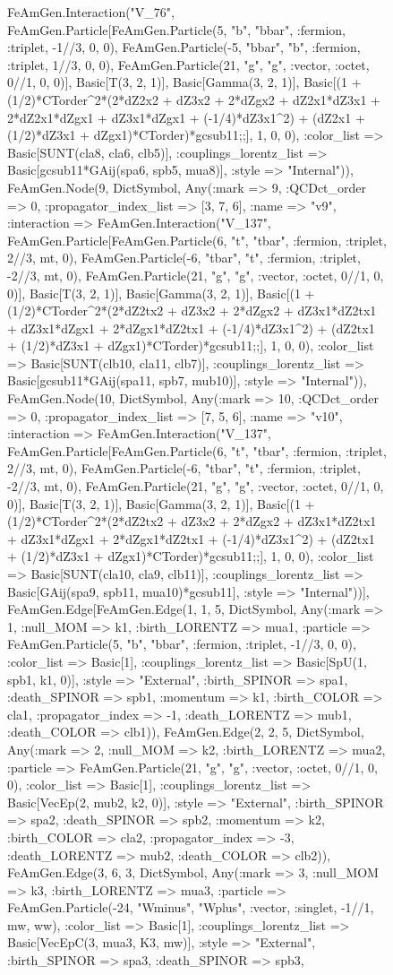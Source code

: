 \documentclass{revtex4}
\begin{document}
\begin{figure}[!htb]
\begin{center}
{FeAmGen.Interaction("V_76", FeAmGen.Particle[FeAmGen.Particle(5, "b", "bbar", :fermion, :triplet, -1//3, 0, 0), FeAmGen.Particle(-5, "bbar", "b", :fermion, :triplet, 1//3, 0, 0), FeAmGen.Particle(21, "g", "g", :vector, :octet, 0//1, 0, 0)], Basic[T(3, 2, 1)], Basic[Gamma(3, 2, 1)], Basic[(1 + (1/2)*CTorder^2*(2*dZ2x2 + dZ3x2 + 2*dZgx2 + dZ2x1*dZ3x1 + 2*dZ2x1*dZgx1 + dZ3x1*dZgx1 + (-1/4)*dZ3x1^2) + (dZ2x1 + (1/2)*dZ3x1 + dZgx1)*CTorder)*gcsub11;;], 1, 0, 0), :color_list => Basic[SUNT(cla8, cla6, clb5)], :couplings_lorentz_list => Basic[gcsub11*GAij(spa6, spb5, mua8)], :style => "Internal")), FeAmGen.Node(9, Dict{Symbol, Any}(:mark => 9, :QCDct_order => 0, :propagator_index_list => [3, 7, 6], :name => "v9", :interaction => FeAmGen.Interaction("V_137", FeAmGen.Particle[FeAmGen.Particle(6, "t", "tbar", :fermion, :triplet, 2//3, mt, 0), FeAmGen.Particle(-6, "tbar", "t", :fermion, :triplet, -2//3, mt, 0), FeAmGen.Particle(21, "g", "g", :vector, :octet, 0//1, 0, 0)], Basic[T(3, 2, 1)], Basic[Gamma(3, 2, 1)], Basic[(1 + (1/2)*CTorder^2*(2*dZ2tx2 + dZ3x2 + 2*dZgx2 + dZ3x1*dZ2tx1 + dZ3x1*dZgx1 + 2*dZgx1*dZ2tx1 + (-1/4)*dZ3x1^2) + (dZ2tx1 + (1/2)*dZ3x1 + dZgx1)*CTorder)*gcsub11;;], 1, 0, 0), :color_list => Basic[SUNT(clb10, cla11, clb7)], :couplings_lorentz_list => Basic[gcsub11*GAij(spa11, spb7, mub10)], :style => "Internal")), FeAmGen.Node(10, Dict{Symbol, Any}(:mark => 10, :QCDct_order => 0, :propagator_index_list => [7, 5, 6], :name => "v10", :interaction => FeAmGen.Interaction("V_137", FeAmGen.Particle[FeAmGen.Particle(6, "t", "tbar", :fermion, :triplet, 2//3, mt, 0), FeAmGen.Particle(-6, "tbar", "t", :fermion, :triplet, -2//3, mt, 0), FeAmGen.Particle(21, "g", "g", :vector, :octet, 0//1, 0, 0)], Basic[T(3, 2, 1)], Basic[Gamma(3, 2, 1)], Basic[(1 + (1/2)*CTorder^2*(2*dZ2tx2 + dZ3x2 + 2*dZgx2 + dZ3x1*dZ2tx1 + dZ3x1*dZgx1 + 2*dZgx1*dZ2tx1 + (-1/4)*dZ3x1^2) + (dZ2tx1 + (1/2)*dZ3x1 + dZgx1)*CTorder)*gcsub11;;], 1, 0, 0), :color_list => Basic[SUNT(cla10, cla9, clb11)], :couplings_lorentz_list => Basic[GAij(spa9, spb11, mua10)*gcsub11], :style => "Internal"))], FeAmGen.Edge[FeAmGen.Edge(1, 1, 5, Dict{Symbol, Any}(:mark => 1, :null_MOM => k1, :birth_LORENTZ => mua1, :particle => FeAmGen.Particle(5, "b", "bbar", :fermion, :triplet, -1//3, 0, 0), :color_list => Basic[1], :couplings_lorentz_list => Basic[SpU(1, spb1, k1, 0)], :style => "External", :birth_SPINOR => spa1, :death_SPINOR => spb1, :momentum => k1, :birth_COLOR => cla1, :propagator_index => -1, :death_LORENTZ => mub1, :death_COLOR => clb1)), FeAmGen.Edge(2, 2, 5, Dict{Symbol, Any}(:mark => 2, :null_MOM => k2, :birth_LORENTZ => mua2, :particle => FeAmGen.Particle(21, "g", "g", :vector, :octet, 0//1, 0, 0), :color_list => Basic[1], :couplings_lorentz_list => Basic[VecEp(2, mub2, k2, 0)], :style => "External", :birth_SPINOR => spa2, :death_SPINOR => spb2, :momentum => k2, :birth_COLOR => cla2, :propagator_index => -3, :death_LORENTZ => mub2, :death_COLOR => clb2)), FeAmGen.Edge(3, 6, 3, Dict{Symbol, Any}(:mark => 3, :null_MOM => k3, :birth_LORENTZ => mua3, :particle => FeAmGen.Particle(-24, "Wminus", "Wplus", :vector, :singlet, -1//1, mw, ww), :color_list => Basic[1], :couplings_lorentz_list => Basic[VecEpC(3, mua3, K3, mw)], :style => "External", :birth_SPINOR => spa3, :death_SPINOR => spb3, }
\end{center}
\end{figure}
\end{document}
